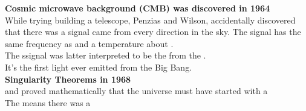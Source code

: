 \textbf{Cosmic microwave background (CMB) was discovered in 1964}\\

While trying building a telescope, Penzias and Wilson, accidentally discovered that there was a signal came from every direction
in the sky. The signal has the same frequency as  and a temperature about .\\

The ssignal was latter interpreted to be the  from the .\\
It's the first light ever emitted from the Big Bang.\\

\textbf{Singularity Theorems in 1968}\\

 and  proved mathematically that the universe must have started with a \\

The means there was a 